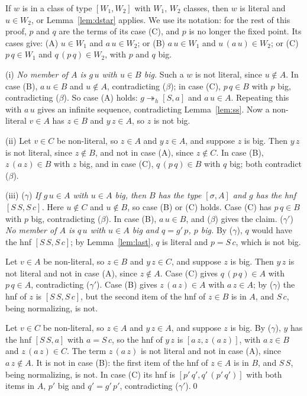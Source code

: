 \documentclass[11pt]{amsart}
\newcommand{\hred}{\twoheadrightarrow_h}
\newcommand{\fr}[1]{[#1]}
\begin{document}
If $w$ is in a class of type $\fr{W_1,W_2}$ with $W_1$, $W_2$ classes, then $w$ is literal and
$u\in W_2$, or Lemma~\ref{lem:dstar} applies. We use its notation: for the rest of this proof, $p$
and $q$ are the terms of its case (C), and $p$ is no longer the fixed point. Its cases give: (A)
$u\in W_1$ and $a\,u\in W_2$; or (B) $a\,u\in W_1$ and $u\,(a\,u)\in W_2$; or (C) $p\,q\in W_1$ and
$q\,(p\,q)\in W_2$, with $p$ and $q$ big.

(i) \emph{No member of $A$ is $g\,u$ with $u\in B$ big.} Such a $w$ is not literal, since
$u\notin A$. In case (B), $a\,u\in B$ and $u\notin A$, contradicting ($\beta$); in case (C),
$p\,q\in B$ with $p$ big, contradicting ($\beta$). So case (A) holds: $g\hred\fr{S,a}$ and $a\,u\in A$. Repeating this
with $a\,u$ gives an infinite sequence, contradicting Lemma~\ref{lem:ss}. Now a non-literal $v\in A$ has
$z\in B$ and $y\,z\in A$, so $z$ is not big.

(ii) Let $v\in C$ be non-literal, so $z\in A$ and $y\,z\in A$, and suppose $z$ is big. Then
$y\,z$ is not literal, since $z\notin B$, and not in case (A), since $z\notin C$. In case (B),
$z\,(a\,z)\in B$ with $z$ big, and in case (C), $q\,(p\,q)\in B$ with $q$ big; both contradict
($\beta$).

(iii) ($\gamma$) \emph{If $g\,u\in A$ with $u\in A$ big, then $B$ has the type $\fr{\sigma,A}$ and $g$ has
the hnf $\fr{S\,S,S\,c}$.} Here $u\notin C$ and $u\notin B$, so case (B) or (C) holds. Case (C) has
$p\,q\in B$ with $p$ big, contradicting ($\beta$). In case (B), $a\,u\in B$, and ($\beta$) gives the
claim. ($\gamma'$) \emph{No member of $A$ is $q\,u$ with $u\in A$ big and $q=g'\,p$, $p$ big.} By
($\gamma$), $q$ would have the hnf $\fr{S\,S,S\,c}$; by Lemma~\ref{lem:last}, $q$ is literal and
$p=S\,c$, which is not big.

Let $v\in A$ be non-literal, so $z\in B$ and $y\,z\in C$, and suppose $z$ is big. Then $y\,z$ is not
literal and not in case (A), since $z\notin A$. Case (C) gives $q\,(p\,q)\in A$ with $p\,q\in A$,
contradicting ($\gamma'$). Case (B) gives $z\,(a\,z)\in A$ with $a\,z\in A$; by ($\gamma$) the hnf of $z$
is $\fr{S\,S,S\,c}$, but the second item of the hnf of $z\in B$ is in $A$, and $S\,c$, being normalizing, is not.

Let $v\in C$ be non-literal, so $z\in A$ and $y\,z\in A$, and suppose $z$ is big. By ($\gamma$),
$y$ has the hnf $\fr{S\,S,a}$ with $a=S\,c$, so the hnf of $y\,z$ is $\fr{a\,z,z\,(a\,z)}$, with
$a\,z\in B$ and $z\,(a\,z)\in C$. The term $z\,(a\,z)$ is not literal and not in case (A), since
$a\,z\notin A$. It is not in case (B): the first item of the hnf of $z\in A$ is in
$B$, and $S\,S$, being normalizing, is not. In case (C) its hnf is $\fr{p'\,q',q'\,(p'\,q')}$ with both items in $A$,
$p'$ big and $q'=g'\,p'$, contradicting ($\gamma'$).\qed
\end{document}
